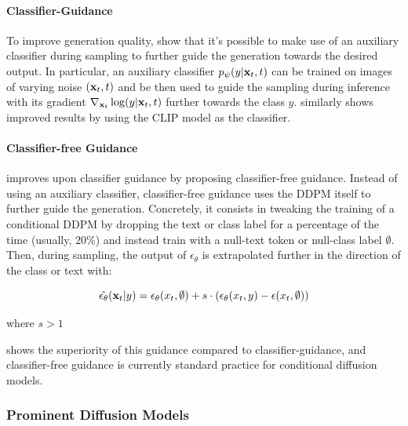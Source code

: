 \paragraph{Classifier-Guidance}\label{subsection:classifier_guidance}
To improve generation quality, \cite{sohl2015deep, song2020score, dhariwal2021diffusion} show that 
it's possible to make use of an auxiliary classifier
during sampling to further guide the generation towards the desired output. 
In particular, an auxiliary classifier $p_\psi(y|\mathbf{x}_t, t)$ can be trained on images of varying noise 
$(\mathbf{x}_t, t)$ 
and be then used to guide the sampling during inference with its gradient 
 $\nabla_{\mathbf{x}_t} \log(y|\mathbf{x}_t, t) $ further towards the class $y$. 
 \cite{nichol2021glide} similarly shows improved results by using the CLIP \citep{radford2021learning}
 model as the classifier.

\paragraph{Classifier-free Guidance}
\cite{ho2022classifierfree} improves upon classifier guidance by 
proposing classifier-free guidance. Instead of using an auxiliary classifier, 
classifier-free guidance uses the \ac{DDPM} itself to further guide the 
generation. Concretely, it consists in tweaking the training of a conditional \ac{DDPM} 
by dropping the text or class label for a percentage of the time (usually, $20\%$)
and instead train with a null-text token or null-class label $\emptyset$. Then, during 
sampling, the output of $\epsilon_\theta$ is extrapolated further in the direction 
of the class or text with:

\begin{equation}
      \hat{\epsilon_\theta}(\mathbf{x}_t|y) = \epsilon_\theta(x_t, \emptyset) + s \cdot (\epsilon_\theta(x_t, y) - \epsilon(x_t, \emptyset))
\end{equation}

\noindent where $s > 1$

\cite{nichol2021glide} shows the superiority of this guidance compared to classifier-guidance,
and classifier-free guidance is currently standard practice for conditional diffusion models.

\subsubsection{Prominent Diffusion Models}

